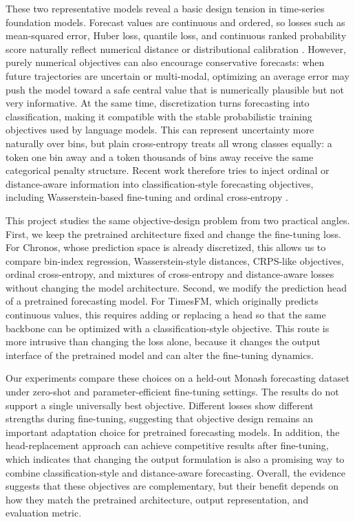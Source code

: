 \documentclass{article}
\begin{document}
These two representative models reveal a basic design tension in time-series
foundation models.  Forecast values are continuous and ordered, so losses such
as mean-squared error, Huber loss, quantile loss, and continuous ranked
probability score naturally reflect numerical distance or distributional
calibration \citep{huber1964robust,koenker1978regression,matheson1976scoring}.
However, purely numerical objectives can also encourage conservative forecasts:
when future trajectories are uncertain or multi-modal, optimizing an average
error may push the model toward a safe central value that is numerically
plausible but not very informative.  At the same time, discretization turns
forecasting into classification, making it compatible with the stable
probabilistic training objectives used by language models.  This can represent
uncertainty more naturally over bins, but plain cross-entropy treats all wrong
classes equally: a token one bin away and a token thousands of bins away receive
the same categorical penalty structure.  Recent work therefore tries to inject
ordinal or distance-aware information into classification-style forecasting
objectives, including Wasserstein-based fine-tuning
\citep{villani2008optimal,chernov2024wasserstein} and ordinal cross-entropy
\citep{wang2025ordinalce}.

This project studies the same objective-design problem from two practical
angles.  First, we keep the pretrained architecture fixed and change the
fine-tuning loss.  For Chronos, whose prediction space is already discretized,
this allows us to compare bin-index regression, Wasserstein-style distances,
CRPS-like objectives, ordinal cross-entropy, and mixtures of cross-entropy and
distance-aware losses without changing the model architecture.  Second, we
modify the prediction head of a pretrained forecasting model.  For TimesFM,
which originally predicts continuous values, this requires adding or replacing a
head so that the same backbone can be optimized with a classification-style
objective.  This route is more intrusive than changing the loss alone, because
it changes the output interface of the pretrained model and can alter the
fine-tuning dynamics.

Our experiments compare these choices on a held-out Monash forecasting dataset
under zero-shot and parameter-efficient fine-tuning settings.  The results do
not support a single universally best objective.  Different losses show
different strengths during fine-tuning, suggesting that objective design remains
an important adaptation choice for pretrained forecasting models.  In addition,
the head-replacement approach can achieve competitive results after fine-tuning,
which indicates that changing the output formulation is also a promising way to
combine classification-style and distance-aware forecasting.  Overall, the
evidence suggests that these objectives are complementary, but their benefit
depends on how they match the pretrained architecture, output representation,
and evaluation metric.
\end{document}
